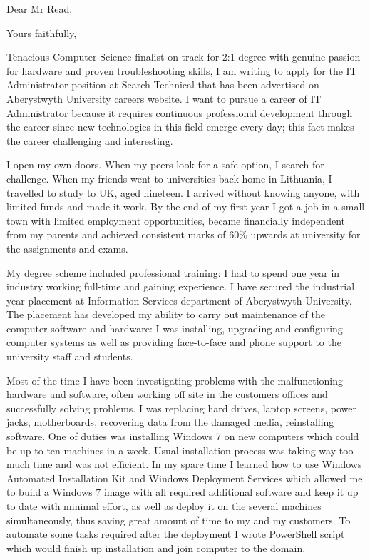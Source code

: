 \documentclass[11pt,a4paper,sans]{moderncv}        %
\begin{document}
\date{\today}
\opening{Dear Mr Read,}
\closing{Yours faithfully,}
\makelettertitle

Tenacious Computer Science finalist on track for 2:1 degree with genuine passion for hardware and proven troubleshooting skills, I am writing to apply for the IT Administrator position at Search Technical that has been advertised on Aberystwyth University careers website. I want to pursue a career of IT Administrator because it requires continuous professional development through the career since new technologies in this field emerge every day; this fact makes the career challenging and interesting.

I open my own doors. When my peers look for a safe option, I search for challenge. When my friends went to universities back home in Lithuania, I travelled to study to UK, aged nineteen. I arrived without knowing anyone, with limited funds and made it work. By the end of my first year I got a job in a small town with limited employment opportunities, became financially independent from my parents and achieved consistent marks of 60\% upwards at university for the assignments and exams.

My degree scheme included professional training: I had to spend one year in industry working full-time and gaining experience.  I have secured the industrial year placement at Information Services department of Aberystwyth University. The placement has developed my ability to carry out maintenance of the computer software and hardware: I was installing, upgrading and configuring computer systems as well as providing face-to-face and phone support to the university staff and students. 

Most of the time I have been investigating problems with the malfunctioning hardware and software, often working off site in the customers offices and successfully solving problems. I was replacing hard drives, laptop screens, power jacks, motherboards, recovering data from the damaged media, reinstalling software. One of duties was installing Windows 7 on new computers which could be up to ten machines in a week. Usual installation process was taking way too much time and was not efficient. In my spare time I learned how to use Windows Automated Installation Kit and Windows Deployment Services which allowed me to build a Windows 7 image with all required additional software and keep it up to date with minimal effort, as well as deploy it on the several machines simultaneously, thus saving great amount of time to my and my customers. To automate some tasks required after the deployment I wrote PowerShell script which would finish up installation and join computer to the domain. 
\end{document}
